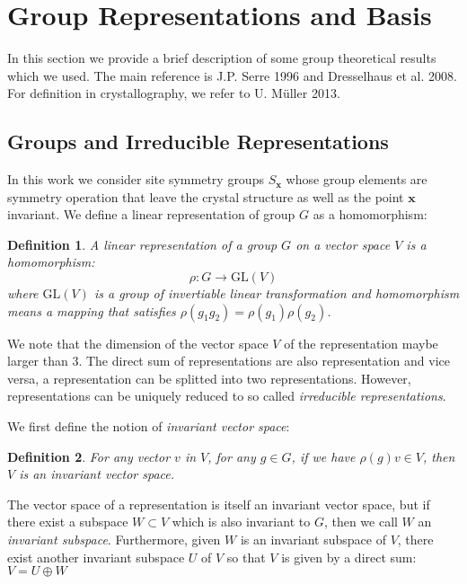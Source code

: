 \documentclass{article}
\newtheorem{definition}{Definition}
\begin{document}
\section{Group Representations and Basis}
In this section we provide a brief description of some group theoretical results
which we used. The main reference is J.P. Serre 1996\cite{serre_linear_1996}
and Dresselhaus et al. 2008\cite{dresselhaus_group_2008}. For definition in crystallography,
we refer to U. M\"{u}ller 2013\cite{muller_symmetry_2013}. 

\subsection{Groups and Irreducible Representations}
In this work we consider site symmetry groups $S_{\mathbf{x}}$ whose group elements are 
symmetry operation that leave the crystal structure as well as the point $\mathbf{x}$ 
invariant\cite{muller_symmetry_2013}. 
We define a linear representation of group $G$ as a homomorphism:
\begin{definition}
    A linear \emph{representation} of a group $G$ on a vector space $V$ is a homomorphism:
    \[\rho\colon G \to \text{GL}(V)\]
    where $\text{GL}(V)$ is a group of invertiable linear transformation and 
    homomorphism means a mapping that satisfies $\rho(g_1g_2) = \rho(g_1)\rho(g_2)$.
\end{definition}
We note that the dimension of the vector space $V$ of the representation maybe larger than 3. 
The direct sum of representations are also representation and vice versa, a representation
can be splitted into two representations. 
However, representations can be uniquely reduced to 
so called \emph{irreducible representations}\cite{serre_linear_1996}.

We first define the notion of \emph{invariant vector space}:
\begin{definition}
    For any vector $v$ in $V$, for any $g\in G$, if we have $\rho(g)v \in V$, then $V$
    is an invariant vector space.
\end{definition} 
The vector space of a representation is itself an invariant vector space, but if there 
exist a subspace $W\subset V$ which is also invariant to $G$, then we call $W$
an \emph{invariant subspace}. 
Furthermore, given $W$ is an invariant subspace of $V$, 
there exist another invariant subspace $U$ of $V$ so that $V$ is given 
by a direct sum: $V = U \oplus W$
\end{document}
